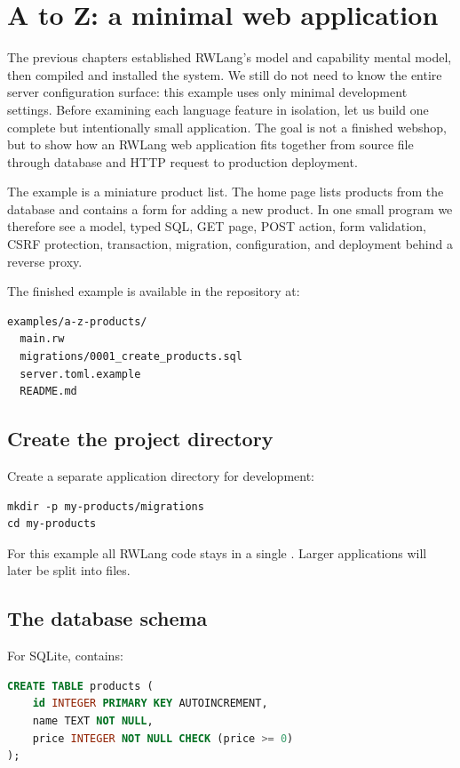 \chapter{A to Z: a minimal web application}

The previous chapters established RWLang's model and capability mental model, then compiled and installed the system. We still do not need to know the entire server configuration surface: this example uses only minimal development settings. Before examining each language feature in isolation, let us build one complete but intentionally small application. The goal is not a finished webshop, but to show how an RWLang web application fits together from source file through database and HTTP request to production deployment.

The example is a miniature product list. The home page lists products from the database and contains a form for adding a new product. In one small program we therefore see a model, typed SQL, GET page, POST action, form validation, CSRF protection, transaction, migration, configuration, and deployment behind a reverse proxy.

The finished example is available in the repository at:

\begin{lstlisting}
examples/a-z-products/
  main.rw
  migrations/0001_create_products.sql
  server.toml.example
  README.md
\end{lstlisting}

\section{Create the project directory}

Create a separate application directory for development:

\begin{lstlisting}
mkdir -p my-products/migrations
cd my-products
\end{lstlisting}

For this example all RWLang code stays in a single . Larger applications will later be split into  files.

\section{The database schema}

For SQLite,  contains:

\begin{lstlisting}[language=SQL]
CREATE TABLE products (
    id INTEGER PRIMARY KEY AUTOINCREMENT,
    name TEXT NOT NULL,
    price INTEGER NOT NULL CHECK (price >= 0)
);
\end{lstlisting}


